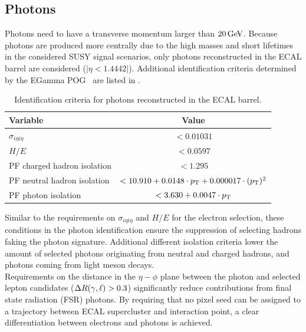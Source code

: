 \subsection{Photons}
Photons need to have a transverse momentum larger than $20\,\text{Ge\hspace{-.08em}V}$. Because photons are produced more centrally due to the high masses and short lifetimes in the considered SUSY signal scenarios, only photons reconstructed in the ECAL barrel are considered ($|\eta<1.4442|$). Additional identification criteria determined by the EGamma POG~\cite{photonID} are listed in .
\begin{table}[h!]
 \centering
 \caption{Identification criteria for photons reconstructed in the ECAL barrel.}
 \label{tab:photonID}
 \begin{tabular}{lc}
  Variable                    & Value                                                \\\hline
  $\sigma_{i\eta i\eta}$      & $<0.01031$                                           \\
  $H/E$                       & $<0.0597$                                            \\
  PF charged hadron isolation & $<1.295$                                             \\
  PF neutral hadron isolation & $<10.910 + 0.0148 \cdot p_{\mathrm{T}} + 0.000017\cdot (p_{\mathrm{T}})^2$ \\
  PF photon isolation         & $<3.630+0.0047\cdot p_{\mathrm{T}}$                             \\\hline
 \end{tabular}
\end{table}
Similar to the requirements on $\sigma_{i\eta i\eta}$ and $H/E$ for the electron selection, these conditions in the photon identification ensure the suppression of selecting hadrons faking the photon signature. Additional different isolation criteria lower the amount of selected photons originating from neutral and charged hadrons, and photons coming from light meson decays.\\
Requirements on the distance in the $\eta-\phi$ plane between the photon and selected lepton candidates ($\Delta R(\gamma,\ell)>0.3$) significantly reduce contributions from final state radiation (FSR) photons. By requiring that no pixel seed can be assigned to a trajectory between ECAL supercluster and interaction point, a clear differentiation between electrons and photons is achieved.

